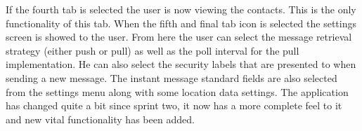 If the fourth tab is selected the user is now viewing the contacts. This is the only functionality of this tab. 
\newline
\newline
When the fifth and final tab icon is selected the settings screen is showed to the user. From here the user can select the message retrieval strategy (either push or pull) as well as the poll interval for the pull implementation. He can also select the security labels that are presented to when sending a new message. The instant message standard fields are also selected from the settings menu along with some location data settings.   
\newline
\newline
The application has changed quite a bit since sprint two, it now has a more complete feel to it and new vital functionality has been added. 